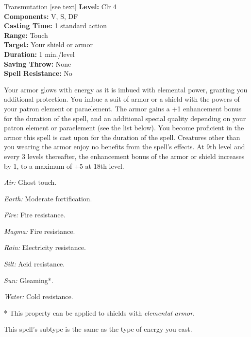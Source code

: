 {Transmutation [see text]}
{
	\textbf{Level:}
	Clr 4\\
	\textbf{Components:}
	V, S, DF\\
	\textbf{Casting Time:}
	1 standard action\\
	\textbf{Range:}
	Touch\\
	\textbf{Target:}
	Your shield or armor\\
	\textbf{Duration:}
	1 min./level\\
	\textbf{Saving Throw:}
	None\\
	\textbf{Spell Resistance:}
	No\\
}
{
	Your armor glows with energy as it is imbued with elemental power, granting you additional protection. You imbue a suit of armor or a shield with the powers of your patron element or paraelement. The armor gains a +1 enhancement bonus for the duration of the spell, and an additional special quality depending on your patron element or paraelement (see the list below). You become proficient in the armor this spell is cast upon for the duration of the spell. Creatures other than you wearing the armor enjoy no benefits from the spell's effects. At 9th level and every 3 levels thereafter, the enhancement bonus of the armor or shield increases by 1, to a maximum of +5 at 18th level.
	\begin{itemize*}
	\item \textit{Air:} Ghost touch.
	\item \textit{Earth:} Moderate fortification.
	\item \textit{Fire:} Fire resistance.
	\item \textit{Magma:} Fire resistance.
	\item \textit{Rain:} Electricity resistance.
	\item \textit{Silt:} Acid resistance.
	\item \textit{Sun:} Gleaming*.
	\item \textit{Water:} Cold resistance.
	\end{itemize*}

	* This property can be applied to shields with \emph{elemental armor}.

	This spell's subtype is the same as the type of energy you cast.
}
